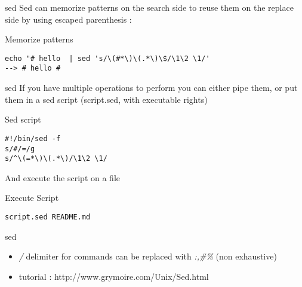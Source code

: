 \begin{frame}[fragile]{sed}
Sed can memorize patterns on the search side to reuse them on the replace side by using escaped parenthesis :
\pause
  \begin{exampleblock}{Memorize patterns}
    \begin{lstlisting}[showstringspaces=false,basicstyle=\tiny]
echo "# hello  | sed 's/\(#*\)\(.*\)\$/\1\2 \1/'
--> # hello #
    \end{lstlisting}
  \end{exampleblock}
\end{frame}

\begin{frame}[fragile]{sed}
If you have multiple operations to perform you can either pipe them, or put them in a sed script (script.sed, with executable rights)
\pause
  \begin{exampleblock}{Sed script}
    \begin{lstlisting}[showstringspaces=false,basicstyle=\tiny]
#!/bin/sed -f
s/#/=/g
s/^\(=*\)\(.*\)/\1\2 \1/
    \end{lstlisting}
  \end{exampleblock}

\pause
And execute the script on a file
  \begin{exampleblock}{Execute Script}
    \begin{lstlisting}[showstringspaces=false,basicstyle=\tiny]
script.sed README.md
    \end{lstlisting}
  \end{exampleblock}
\end{frame}


\begin{frame}[fragile]{sed}
  \begin{itemize}
    \item\emph{/} delimiter for commands can be replaced with \emph{:,\#\%} (non exhaustive)
    \pause
    
    \item tutorial : http://www.grymoire.com/Unix/Sed.html
  \end{itemize}
\end{frame}

